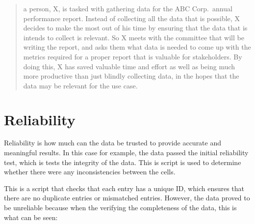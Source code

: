 \documentclass[
]{book}
\newenvironment{Shaded}{\begin{snugshade}}{\end{snugshade}}
\newcommand{\ControlFlowTok}[1]{\textcolor[rgb]{0.13,0.29,0.53}{\textbf{#1}}}
\newcommand{\DecValTok}[1]{\textcolor[rgb]{0.00,0.00,0.81}{#1}}
\newcommand{\KeywordTok}[1]{\textcolor[rgb]{0.13,0.29,0.53}{\textbf{#1}}}
\newcommand{\NormalTok}[1]{#1}
\newcommand{\OperatorTok}[1]{\textcolor[rgb]{0.81,0.36,0.00}{\textbf{#1}}}
\newcommand{\StringTok}[1]{\textcolor[rgb]{0.31,0.60,0.02}{#1}}
\begin{document}
\begin{quote}
a person, X, is tasked with gathering data for the ABC Corp.~annual performance report. Instead of collecting all the data that is possible, X decides to make the most out of his time by ensuring that the data that is intends to collect is relevant. So X meets with the committee that will be writing the report, and asks them what data is needed to come up with the metrics required for a proper report that is valuable for stakeholders. By doing this, X has saved valuable time and effort as well as being much more productive than just blindly collecting data, in the hopes that the data may be relevant for the use case.
\end{quote}

\hypertarget{reliability}{%
\section{Reliability}\label{reliability}}

Reliability is how much can the data be trusted to provide accurate and meaningful results. In this case for example, the data passed the initial reliability test, which is tests the integrity of the data. This is script is used to determine whether there were any inconsistencies between the cells.

\begin{Shaded}
\end{Shaded}

This is a script that checks that each entry has a unique ID, which ensures that there are no duplicate entries or mismatched entries. However, the data proved to be unreliable because when the verifying the completeness of the data, this is what can be seen:
\end{document}
